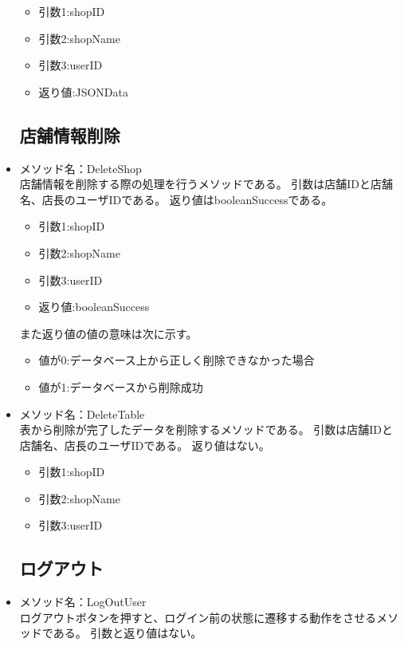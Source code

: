 \documentclass[a4j]{jarticle}
\begin{document}
\begin{itemize}
	\begin{itemize}
		\item 引数1:shopID
		\item 引数2:shopName
		\item 引数3:userID
		\item 返り値:JSONData
	\end{itemize}
\subsection{店舗情報削除}
%
\item メソッド名：DeleteShop\\

店舗情報を削除する際の処理を行うメソッドである。
引数は店舗IDと店舗名、店長のユーザIDである。
返り値はbooleanSuccessである。

	\begin{itemize}
		\item 引数1:shopID
		\item 引数2:shopName
		\item 引数3:userID
		\item 返り値:booleanSuccess
	\end{itemize}
また返り値の値の意味は次に示す。
	\begin{itemize}
		\item 値が0:データベース上から正しく削除できなかった場合
		\item 値が1:データベースから削除成功
	\end{itemize}

\item メソッド名：DeleteTable\\

表から削除が完了したデータを削除するメソッドである。
引数は店舗IDと店舗名、店長のユーザIDである。
返り値はない。
	\begin{itemize}
		\item 引数1:shopID
		\item 引数2:shopName
		\item 引数3:userID
	\end{itemize}

\subsection{ログアウト}
%
\item メソッド名：LogOutUser\\
ログアウトボタンを押すと、ログイン前の状態に遷移する動作をさせるメソッドである。
引数と返り値はない。
%

\end{itemize}
\end{document}
